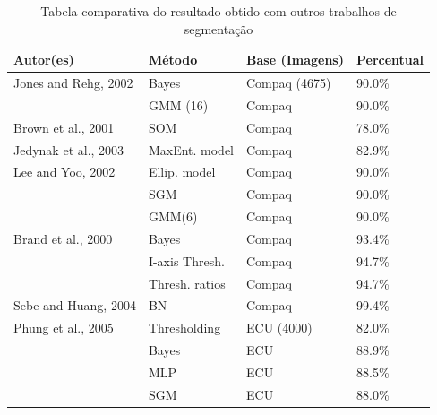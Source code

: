 \documentclass[12pt,oneside,a4paper,english,french,spanish,brazil,]{abntex2}
\begin{document}
\begin{table}
\centering
\caption{Tabela comparativa do resultado obtido com outros trabalhos de segmentação }
\label{tab:ComparativoResultados}
\begin{tabular}{llll}
\hline
\textbf{Autor(es)}           & \textbf{Método} & \textbf{Base (Imagens)}         & \textbf{Percentual} \\ \hline
Jones and Rehg, 2002         & Bayes                          & Compaq (4675) & 90.0\%              \\
                             & GMM (16)                       & Compaq                & 90.0\%              \\
Brown et al., 2001           & SOM                            & Compaq                & 78.0\%              \\
Jedynak et al., 2003         & MaxEnt. model                  & Compaq                & 82.9\%              \\
Lee and Yoo, 2002            & Ellip. model                   & Compaq                & 90.0\%              \\
                             & SGM                            & Compaq                & 90.0\%              \\
                             & GMM(6)                         & Compaq                & 90.0\%              \\
Brand et al., 2000           & Bayes                          & Compaq                & 93.4\%              \\
                             & I-axis Thresh.                 & Compaq                & 94.7\%              \\
                             & Thresh. ratios                 & Compaq                & 94.7\%              \\
Sebe and Huang, 2004         & BN                             & Compaq                & 99.4\%              \\
Phung et al., 2005           & Thresholding                   & ECU (4000)    & 82.0\%              \\
                             & Bayes                          & ECU                   & 88.9\%              \\
                             & MLP                            & ECU                   & 88.5\%              \\
                             & SGM                            & ECU                   & 88.0\%              \\

\end{tabular}
\end{table}
\end{document}
